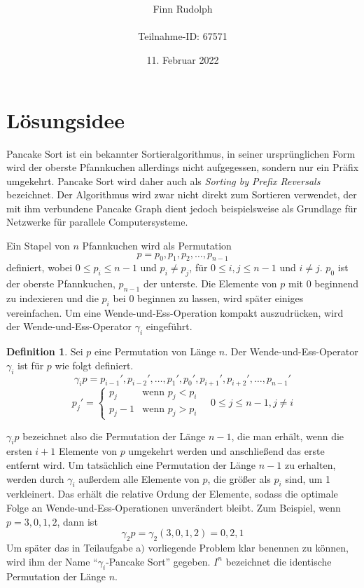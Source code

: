 \documentclass[a4paper, 10pt, ngerman]{article}
\title{\LARGE \textbf{\Aufgabe}}
\author{\large Finn Rudolph \\ \\ \large Teilnahme-ID: 67571}
\date{\large 11. Februar 2022}
\begin{document}
\begin{titlepage}
    \maketitle
    \tableofcontents
    \thispagestyle{empty}
\end{titlepage}

\newtheorem{theorem}{Satz}
\newtheorem{lemma}{Lemma}
\theoremstyle{definition}
\newtheorem{definition}{Definition}

\section{Lösungsidee}

Pancake Sort ist ein bekannter Sortieralgorithmus, in seiner ursprünglichen Form wird der oberste Pfannkuchen allerdings nicht aufgegessen, sondern nur ein Präfix umgekehrt. Pancake Sort wird daher auch als \emph{Sorting by Prefix Reversals} bezeichnet. Der Algorithmus wird zwar nicht direkt zum Sortieren verwendet, der mit ihm verbundene Pancake Graph dient jedoch beispielsweise als Grundlage für Netzwerke für parallele Computersysteme.

Ein Stapel von $n$ Pfannkuchen wird als Permutation
$$
    p = p_0, p_1, p_2, \dots, p_{n - 1}
$$
definiert, wobei $0 \le p_i \le n-1$ und $p_i \ne p_j$, für $0 \le i, j \le n-1$ und $i \ne j$. $p_0$ ist der oberste Pfannkuchen, $p_{n - 1}$ der unterste. Die Elemente von $p$ mit 0 beginnend zu indexieren und die $p_i$ bei 0 beginnen zu lassen, wird später einiges vereinfachen. Um eine Wende-und-Ess-Operation kompakt auszudrücken, wird der Wende-und-Ess-Operator $\gamma_i$ eingeführt.

\begin{definition}
    Sei $p$ eine Permutation von Länge $n$. Der Wende-und-Ess-Operator $\gamma_i$ ist für $p$ wie folgt definiert.
    $$
        \gamma_i p = p_{i-1}', p_{i-2}', \dots, p_1', p_0', p_{i+1}', p_{i+2}', \dots, p_{n-1}'
    $$
    $$
        p_j' = \begin{cases}
            p_j     & \text{wenn } p_j < p_i \\
            p_j - 1 & \text{wenn } p_j > p_i
        \end{cases}
        \quad 0 \le j \le n - 1, j \ne i
    $$
\end{definition}

$\gamma_i p$ bezeichnet also die Permutation der Länge $n - 1$, die man erhält, wenn die ersten $i+1$ Elemente von $p$ umgekehrt werden und anschließend das erste entfernt wird. Um tatsächlich eine Permutation der Länge $n - 1$ zu erhalten, werden durch $\gamma_i$ außerdem alle Elemente von $p$, die größer als $p_i$ sind, um 1 verkleinert. Das erhält die relative Ordung der Elemente, sodass die optimale Folge an Wende-und-Ess-Operationen unverändert bleibt. Zum Beispiel, wenn $p = 3, 0, 1, 2$, dann ist
$$
    \gamma_2 p = \gamma_2 (3, 0, 1, 2) = 0, 2, 1
$$
Um später das in Teilaufgabe a$)$ vorliegende Problem klar benennen zu können, wird ihm der Name ``$\gamma_i$-Pancake Sort'' gegeben. $I^n$ bezeichnet die identische Permutation der Länge $n$.
\end{document}
